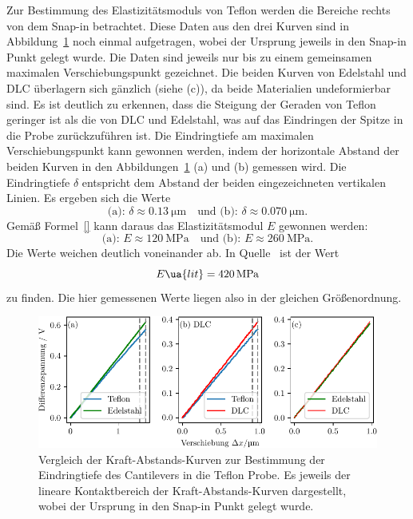 Zur Bestimmung des Elastizitätsmoduls von Teflon werden die Bereiche rechts von dem Snap-in betrachtet. Diese Daten aus den drei Kurven sind
in Abbildung~\ref{fig: depth} noch einmal aufgetragen, wobei der Ursprung jeweils in den Snap-in Punkt gelegt wurde. Die Daten sind
jeweils nur bis zu einem gemeinsamen maximalen Verschiebungspunkt gezeichnet.
Die beiden Kurven von Edelstahl und DLC überlagern sich gänzlich (siehe (c)), da beide Materialien undeformierbar sind.
Es ist deutlich zu erkennen, dass
die Steigung der Geraden von Teflon geringer ist als die von DLC und Edelstahl, was auf das Eindringen der Spitze in die Probe zurückzuführen ist.
Die Eindringtiefe am maximalen Verschiebungspunkt kann gewonnen werden, indem der horizontale Abstand der beiden Kurven in den Abbildungen~\ref{fig: depth}
(a) und (b) gemessen wird. Die Eindringtiefe $\delta$ entspricht dem Abstand der beiden eingezeichneten vertikalen Linien.
Es ergeben sich die Werte
\begin{equation}
  \text{(a): } \delta \approx \SI{0.13}{\micro\meter} \quad \text{und (b): }\delta \approx \SI{0.070}{\micro\meter}.
\end{equation}
Gemäß Formel~\eqref{} kann daraus das Elastizitätsmodul $E$ gewonnen werden:
\begin{equation}
  \text{(a): } E \approx \SI{120}{\mega \pascal} \quad \text{und (b): } E \approx \SI{260}{\mega \pascal}.
\end{equation}
Die Werte weichen deutlich voneinander ab.
In Quelle~\cite{emodulteflon} ist der Wert
\begin{equation}
  E\ua{lit} = \SI{420}{\mega \pascal}
\end{equation}
zu finden. Die hier gemessenen Werte liegen also in der gleichen Größenordnung.

\begin{figure}
  \centering
  \includegraphics[scale = 1]{../analysis/data/force_distance/eindringtiefe.pdf}
  \caption{Vergleich der Kraft-Abstands-Kurven zur Bestimmung der Eindringtiefe des Cantilevers in die Teflon Probe.
  Es jeweils der lineare Kontaktbereich der Kraft-Abstands-Kurven dargestellt, wobei der Ursprung in den Snap-in Punkt
  gelegt wurde.}
  \label{fig: depth}
\end{figure}

